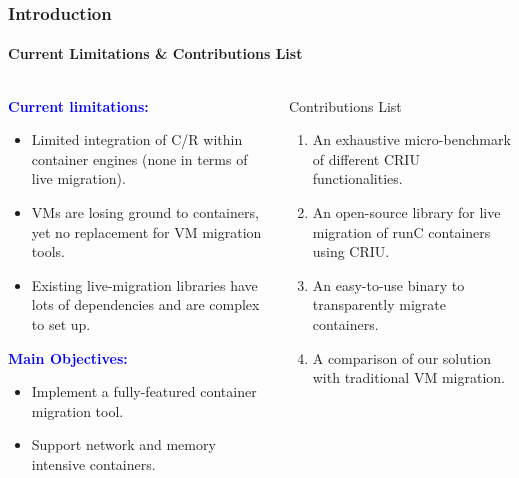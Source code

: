\documentclass[9pt,    %
    english,            %
    xcolor=table,       %
    envcountsect,        %
    aspectratio=169     %
]{beamer}
\begin{document}
\begin{frame}
    \frametitle{Introduction}
    \framesubtitle{Current Limitations \& Contributions List}

    \vspace{-10pt}

    \begin{columns}[T]
        \begin{column}{.5\textwidth}
            \textbf{\textcolor{blue}{Current limitations:}}
            \begin{itemize}
                \item Limited integration of C/R within container engines (none in terms of live migration).
                \item VMs are losing ground to containers, yet no replacement for VM migration tools.
                \item Existing live-migration libraries have lots of dependencies and are complex to set up.
            \end{itemize}
            \textbf{\textcolor{blue}{Main Objectives:}}
            \begin{itemize}
                \item Implement a fully-featured container migration tool.
                \item Support network and memory intensive containers.
            \end{itemize}
        \end{column}
        \begin{column}{.5\textwidth}
            \begin{alertblock}{Contributions List}
                \begin{enumerate}
                    \item An exhaustive micro-benchmark of different CRIU functionalities.
                    \item An open-source library for live migration of runC containers using CRIU.
                    \item An easy-to-use binary to transparently migrate containers.
                    \item A comparison of our solution with traditional VM migration.
                \end{enumerate}
            \end{alertblock}\hfill
        \end{column}
    \end{columns}

\end{frame}
\end{document}
